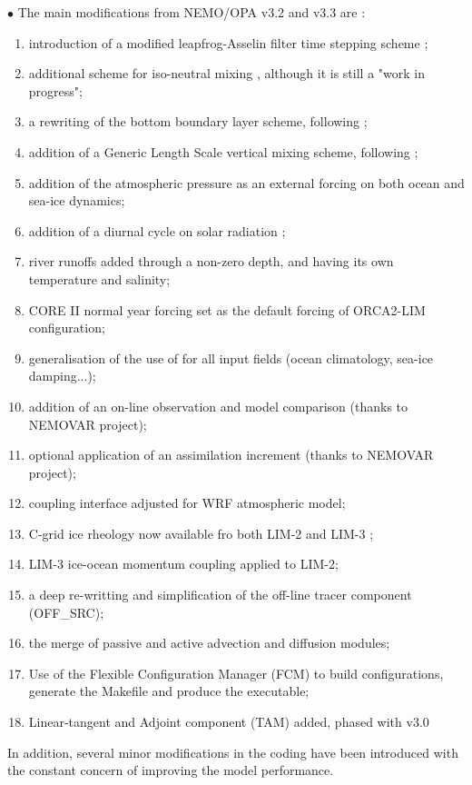 \documentclass[../main/NEMO_manual]{subfiles}
\begin{document}
 \vspace{1cm}
$\bullet$ The main modifications from NEMO/OPA v3.2 and v3.3 are :\\
\begin{enumerate}
\item
  introduction of a modified leapfrog-Asselin filter time stepping scheme
  \citep{Leclair_Madec_OM09}; 
\item
  additional scheme for iso-neutral mixing \citep{Griffies_al_JPO98}, although it is still a "work in progress";
\item
  a rewriting of the bottom boundary layer scheme, following \citet{Campin_Goosse_Tel99};
\item
  addition of a Generic Length Scale vertical mixing scheme, following \citet{Umlauf_Burchard_JMS03};
\item
  addition of the atmospheric pressure as an external forcing on both ocean and sea-ice dynamics;
\item
  addition of a diurnal cycle on solar radiation \citep{Bernie_al_CD07};
\item
  river runoffs added through a non-zero depth, and having its own temperature and salinity;
\item
  CORE II normal year forcing set as the default forcing of ORCA2-LIM configuration;
\item
  generalisation of the use of  for all input fields (ocean climatology, sea-ice damping...);
\item
  addition of an on-line observation and model comparison (thanks to NEMOVAR project);
\item
  optional application of an assimilation increment (thanks to NEMOVAR project);
\item
  coupling interface adjusted for WRF atmospheric model;
\item
  C-grid ice rheology now available fro both LIM-2 and LIM-3 \citep{Bouillon_al_OM09};
\item
  LIM-3 ice-ocean momentum coupling applied to LIM-2;
\item
  a deep re-writting and simplification of the off-line tracer component (OFF\_SRC);
\item
  the merge of passive and active advection and diffusion modules;
\item
  Use of the Flexible Configuration Manager (FCM) to build configurations,
  generate the Makefile and produce the executable;
\item
  Linear-tangent and Adjoint component (TAM) added, phased with v3.0
\end{enumerate}
\vspace{1cm}
In addition, several minor modifications in the coding have been introduced with the constant concern of
improving the model performance. 
\end{document}
